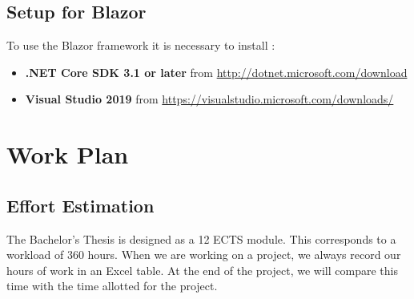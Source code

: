 \documentclass{scrartcl}
\begin{document}
\subsection{Setup for Blazor}
To use the Blazor framework it is necessary to install :\\
\begin{itemize}
\item \textbf{.NET Core SDK 3.1 or later} from \url {http://dotnet.microsoft.com/download}
\item \textbf{Visual Studio 2019} from \url {https://visualstudio.microsoft.com/downloads/}
\end{itemize}








\section{Work Plan}
  		\subsection{Effort Estimation}
  		
  		The Bachelor's Thesis  is designed as a 12 ECTS module. This corresponds to a workload of 360 hours. When we are working on a project, we always record our hours of work in an Excel table.
 At the end of the project, we will compare this time with the time allotted for the project. 		
  		
  		
  		
  		
  		
\end{document}
